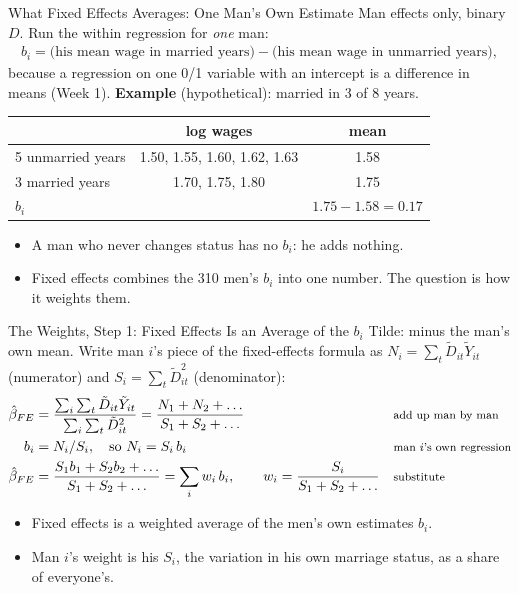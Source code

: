 \documentclass[aspectratio=169,11pt,xcolor=dvipsnames]{beamer}
\begin{document}
\begin{frame}{What Fixed Effects Averages: One Man's Own Estimate}
Man effects only, binary $D$. Run the within regression for \emph{one} man:
\begin{align*}
  b_i = \text{(his mean wage in married years)} - \text{(his mean wage in unmarried years)},
\end{align*}
because a regression on one 0/1 variable with an intercept is a difference in means (Week 1).
\textbf{Example} (hypothetical): married in 3 of 8 years.
\begin{center}\small
\renewcommand{\arraystretch}{1.1}
\begin{tabular}{@{}lcc@{}}
\toprule
 & log wages & mean \\
\midrule
5 unmarried years & 1.50, 1.55, 1.60, 1.62, 1.63 & 1.58 \\
3 married years & 1.70, 1.75, 1.80 & 1.75 \\
\midrule
$b_i$ & & $1.75 - 1.58 = 0.17$ \\
\bottomrule
\end{tabular}
\end{center}
\begin{itemize}\itemsep3pt
  \item A man who never changes status has no $b_i$: he adds nothing.
  \item Fixed effects combines the 310 men's $b_i$ into one number. The question is
        how it weights them.
\end{itemize}
\end{frame}

\begin{frame}{The Weights, Step 1: Fixed Effects Is an Average of the $b_i$}
Tilde: minus the man's own mean. Write man $i$'s piece of the fixed-effects formula as
$N_i = \sum_t \tilde D_{it}\tilde Y_{it}$ (numerator) and $S_i = \sum_t \tilde D_{it}^2$ (denominator):
\begin{align*}
  \hat\beta_{FE} &= \frac{\sum_i\sum_t \tilde D_{it}\tilde Y_{it}}{\sum_i\sum_t \tilde D_{it}^2}
   = \frac{N_1 + N_2 + \dots}{S_1 + S_2 + \dots}
   && \text{\footnotesize add up man by man} \\
  b_i &= N_i / S_i, \quad\text{so } N_i = S_i\, b_i
   && \text{\footnotesize man $i$'s own regression} \\
  \hat\beta_{FE} &= \frac{S_1 b_1 + S_2 b_2 + \dots}{S_1 + S_2 + \dots}
   = \sum_i w_i\, b_i, \qquad w_i = \frac{S_i}{S_1 + S_2 + \dots}
   && \text{\footnotesize substitute}
\end{align*}
\begin{itemize}\itemsep4pt
  \item Fixed effects is a weighted average of the men's own estimates $b_i$.
  \item Man $i$'s weight is his $S_i$, the variation in his own marriage status, as a
        share of everyone's.
\end{itemize}
\end{frame}
\end{document}
